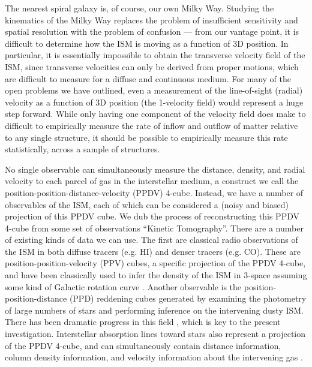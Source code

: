The nearest spiral galaxy is, of course, our own Milky Way. 
Studying the kinematics of the Milky Way replaces the problem of insufficient sensitivity and spatial resolution with the problem of confusion --- from our vantage point, it is difficult to determine how the ISM is moving as a function of 3D position.
In particular, it is essentially impossible to obtain the transverse velocity field of the ISM, since transverse velocities can only be derived from proper motions, which are difficult to measure for a diffuse and continuous medium.
For many of the open problems we have outlined, even a measurement of the line-of-sight (radial) velocity as a function of 3D position (the 1-velocity field) would represent a huge step forward. 
While only having one component of the velocity field does make to difficult to empirically measure the  rate of inflow and outflow of matter relative to any single structure, it should be possible to empirically measure this rate statistically, across a sample of structures. 

No single observable can simultaneously measure the distance, density, and radial velocity to each parcel of gas in the interstellar medium, a construct we call the position-position-distance-velocity (PPDV) 4-cube. Instead, we have a number of observables of the ISM, each of which can be considered a (noisy and biased) projection of this PPDV cube. We dub the process of reconstructing this PPDV 4-cube from some set of observations ``Kinetic Tomography''. There are a number of existing kinds of data we can use. The first are classical radio observations of the ISM in both diffuse tracers (e.g. HI) and denser tracers (e.g. CO). These are position-position-velocity (PPV) cubes, a specific projection of the PPDV 4-cube, and have been classically used to infer the density of the ISM in 3-space assuming some kind of Galactic rotation curve \citep[e.g.][ and references therein]{Levine_2006}. Another observable is the position-position-distance (PPD) reddening cubes generated by examining the photometry of large numbers of stars and performing inference on the intervening dusty ISM. There has been dramatic progress in this field \citep{Marshall_2006,Lallement_2014,Green_2015}, which is key to the present investigation. Interstellar absorption lines toward stars also represent a projection of the PPDV 4-cube, and can simultaneously contain distance information, column density information, and velocity information about the intervening gas \citep{Welsh10,Zasowski_2014,2015MmSAI..86..521Z}.

